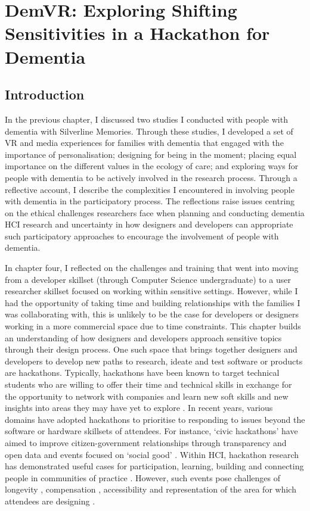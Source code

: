 \chapter{DemVR: Exploring Shifting Sensitivities in a Hackathon for Dementia}
\label{DemVR}

\section{Introduction}
\label{sec:DemVRIntroduction}
In the previous chapter, I discussed two studies I conducted with people with dementia with Silverline Memories. Through these studies, I developed a set of VR and media experiences for families with dementia that engaged with the importance of personalisation; designing for being in the moment; placing equal importance on the different values in the ecology of care; and exploring ways for people with dementia to be actively involved in the research process. Through a reflective account, I describe the complexities I encountered in involving people with dementia in the participatory process. The reflections raise issues centring on the ethical challenges researchers face when planning and conducting dementia HCI research and uncertainty in how designers and developers can appropriate such participatory approaches to encourage the involvement of people with dementia.

In chapter four, I reflected on the challenges and training that went into moving from a developer skillset (through Computer Science undergraduate) to a user researcher skillset focused on working within sensitive settings. However, while I had the opportunity of taking time and building relationships with the families I was collaborating with, this is unlikely to be the case for developers or designers working in a more commercial space due to time constraints. This chapter builds an understanding of how designers and developers approach sensitive topics through their design process. One such space that brings together designers and developers to develop new paths to research, ideate and test software or products are hackathons. Typically, hackathons have been known to target technical students who are willing to offer their time and technical skills in exchange for the opportunity to network with companies and learn new soft skills and new insights into areas they may have yet to explore \citep{olesen_what_2021}. In recent years, various domains have adopted hackathons to prioritise to responding to issues beyond the software or hardware skillsets of attendees. For instance, `civic hackathons' \citep{johnson_civic_2014} have aimed to improve citizen-government relationships through transparency and open data and events focused on `social good' \citep{ferrario_software_2014}. Within HCI, hackathon research has demonstrated useful cases for participation, learning, building and connecting people in communities of practice \citep{falk_olesen_10_2020, birbeck_self_2017, hou_hacking_2017, johnson_civic_2014}. However, such events pose challenges of longevity \citep{birbeck_self_2017}, compensation \citep{endrissat_hackathons_2018}, accessibility \citep{hope_hackathons_2019} and representation of the area for which attendees are designing \citep{toombs_hackerspace_2017}. 

